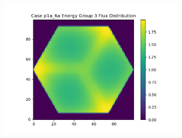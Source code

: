 \documentclass[letterpaper,11pt]{report}
\begin{document}
\begin{figure}[H]
\begin{subfigure}{.33\textwidth}
              \includegraphics[width=1.1\linewidth]{../../phase1a/case6a/analysis_output/p1a_6a_e_eg3.png}
              \caption{}
            \end{subfigure}
  

\end{figure}
\end{document}
